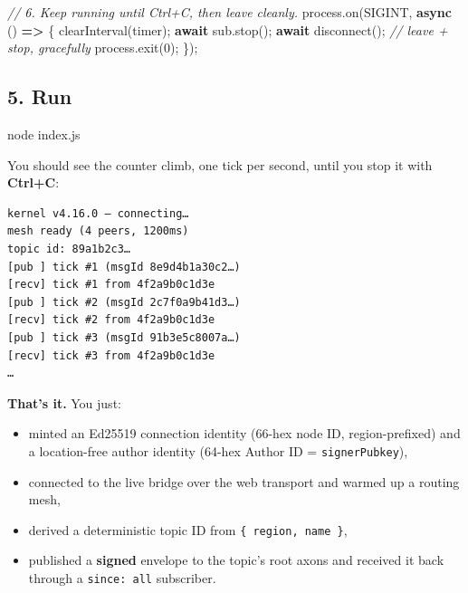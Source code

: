 \documentclass[
  nobib]{tufte-handout}
\newenvironment{Shaded}{}{}
\newcommand{\BuiltInTok}[1]{\textcolor[rgb]{0.00,0.50,0.00}{#1}}
\newcommand{\CommentTok}[1]{\textcolor[rgb]{0.38,0.63,0.69}{\textit{#1}}}
\newcommand{\ControlFlowTok}[1]{\textcolor[rgb]{0.00,0.44,0.13}{\textbf{#1}}}
\newcommand{\DecValTok}[1]{\textcolor[rgb]{0.25,0.63,0.44}{#1}}
\newcommand{\ExtensionTok}[1]{#1}
\newcommand{\FunctionTok}[1]{\textcolor[rgb]{0.02,0.16,0.49}{#1}}
\newcommand{\KeywordTok}[1]{\textcolor[rgb]{0.00,0.44,0.13}{\textbf{#1}}}
\newcommand{\NormalTok}[1]{#1}
\newcommand{\OperatorTok}[1]{\textcolor[rgb]{0.40,0.40,0.40}{#1}}
\newcommand{\PreprocessorTok}[1]{\textcolor[rgb]{0.74,0.48,0.00}{#1}}
\newcommand{\StringTok}[1]{\textcolor[rgb]{0.25,0.44,0.63}{#1}}
\providecommand{\tightlist}{%
  \setlength{\itemsep}{0pt}\setlength{\parskip}{0pt}}
\begin{document}
\begin{Shaded}
\begin{Highlighting}[]
\CommentTok{// 6. Keep running until Ctrl+C, then leave cleanly.}
\BuiltInTok{process}\OperatorTok{.}\FunctionTok{on}\NormalTok{(}\StringTok{\textquotesingle{}SIGINT\textquotesingle{}}\OperatorTok{,} \KeywordTok{async}\NormalTok{ () }\KeywordTok{=\textgreater{}}\NormalTok{ \{}
  \PreprocessorTok{clearInterval}\NormalTok{(timer)}\OperatorTok{;}
  \ControlFlowTok{await}\NormalTok{ sub}\OperatorTok{.}\FunctionTok{stop}\NormalTok{()}\OperatorTok{;}
  \ControlFlowTok{await} \FunctionTok{disconnect}\NormalTok{()}\OperatorTok{;}          \CommentTok{// leave + stop, gracefully}
  \BuiltInTok{process}\OperatorTok{.}\FunctionTok{exit}\NormalTok{(}\DecValTok{0}\NormalTok{)}\OperatorTok{;}
\NormalTok{\})}\OperatorTok{;}
\end{Highlighting}
\end{Shaded}

\subsection{5. Run}\label{run}

\begin{Shaded}
\begin{Highlighting}[]
\ExtensionTok{node}\NormalTok{ index.js}
\end{Highlighting}
\end{Shaded}

You should see the counter climb, one tick per second, until you stop it
with \textbf{Ctrl+C}:

\begin{verbatim}
kernel v4.16.0 — connecting…
mesh ready (4 peers, 1200ms)
topic id: 89a1b2c3…
[pub ] tick #1 (msgId 8e9d4b1a30c2…)
[recv] tick #1 from 4f2a9b0c1d3e
[pub ] tick #2 (msgId 2c7f0a9b41d3…)
[recv] tick #2 from 4f2a9b0c1d3e
[pub ] tick #3 (msgId 91b3e5c8007a…)
[recv] tick #3 from 4f2a9b0c1d3e
…
\end{verbatim}

\textbf{That's it.} You just:

\begin{itemize}
\tightlist
\item
  minted an Ed25519 connection identity (66-hex node ID,
  region-prefixed) and a location-free author identity (64-hex Author ID
  = \texttt{signerPubkey}),
\item
  connected to the live bridge over the web transport and warmed up a
  routing mesh,
\item
  derived a deterministic topic ID from \texttt{\{\ region,\ name\ \}},
\item
  published a \textbf{signed} envelope to the topic's root axons and
  received it back through a
  \texttt{since:\ \textquotesingle{}all\textquotesingle{}} subscriber.
\end{itemize}
\end{document}
